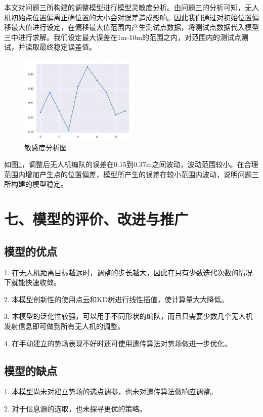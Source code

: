 \documentclass{my_paper}
\begin{document}
本文对问题三所构建的调整模型进行模型灵敏度分析。由问题三的分析可知，无人机初始点位置偏离正确位置的大小会对误差造成影响。因此我们通过对初始位置偏移最大值进行设定，在偏移最大值范围内产生测试点数据，将测试点数据代入模型三中进行求解。我们设定最大误差在1m-10m的范围之内，对范围内的测试点测试，并读取最终稳定误差值。

\begin{figure}[h]
    \centering
    \includegraphics[width=0.5\textwidth]{images/mingandu.jpg}
    \caption{敏感度分析图}
    \label{lingmindu}
\end{figure}

如图\ref{lingmindu}，调整后无人机编队的误差在0.15到0.37m之间波动，波动范围较小。在合理范围内增加产生点的位置偏差，模型所产生的误差在较小范围内波动，说明问题三所构建的模型稳定。




\section{七、模型的评价、改进与推广}


\subsection{模型的优点}
1. 在无人机距离目标越远时，调整的步长越大，因此在只有少数迭代次数的情况下就能快速收敛。

2. 本模型创新性的使用点云和KD树进行线性插值，使计算量大大降低。

3. 本模型的泛化性较强，可以用于不同形状的编队，而且只需要少数几个无人机发射信息即可做到所有无人机的调整。

4. 在手动建立的势场表现不好时还可使用遗传算法对势场做进一步优化。

\subsection{模型的缺点}
1. 本模型尚未对建立势场的选点调参，也未对遗传算法做响应调整。

2. 对于信息源的选取，也未探寻更优的策略。
\end{document}
